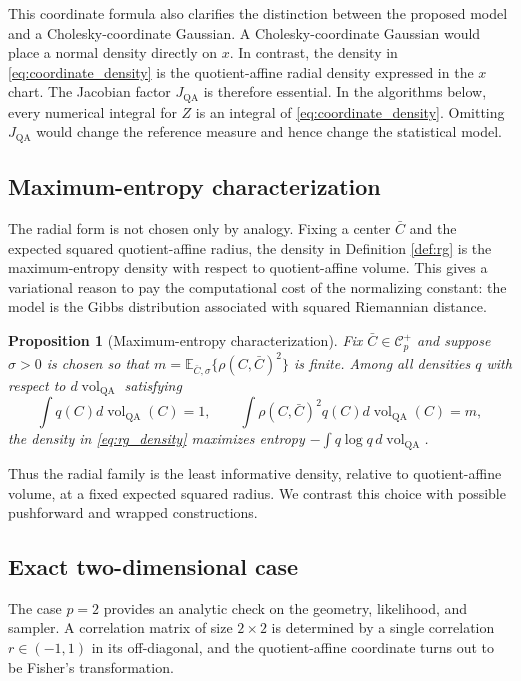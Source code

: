 \documentclass[
  12pt]{article}
\newcommand{\Corr}{\mathcal C^+}
\newcommand{\vol}{\operatorname{vol}}
\newcommand{\E}{\mathbb E}
\newcommand{\QA}{\mathrm{QA}}
\newtheorem{proposition}{Proposition}
\begin{document}
This coordinate formula also clarifies the distinction between the proposed model and a Cholesky-coordinate Gaussian. A Cholesky-coordinate Gaussian would place a normal density directly on $x$. In contrast, the density in \eqref{eq:coordinate_density} is the quotient-affine radial density expressed in the $x$ chart. The Jacobian factor $J_{\QA}$ is therefore essential. In the algorithms below, every numerical integral for $Z$ is an integral of \eqref{eq:coordinate_density}. Omitting $J_{\QA}$ would change the reference measure and hence change the statistical model.



\subsection{Maximum-entropy characterization}

The radial form is not chosen only by analogy. Fixing a center $\bar C$ and  the expected squared quotient-affine radius, the density in Definition \ref{def:rg} is the maximum-entropy density with respect to quotient-affine volume. This gives a variational reason to pay the computational cost of the normalizing constant: the model is the Gibbs distribution associated with squared Riemannian distance.

\begin{proposition}[Maximum-entropy characterization]\label{prop:max_entropy}
Fix $\bar C\in\Corr_p$ and suppose $\sigma>0$ is chosen so that $m=\E_{\bar C,\sigma}\{\rho(C,\bar C)^2\}$ is finite. Among all densities $q$ with respect to $d\vol_{\QA}$ satisfying
\[
\int q(C)d\vol_{\QA}(C)=1,
\qquad
\int \rho(C,\bar C)^2q(C)d\vol_{\QA}(C)=m,
\]
the density in \eqref{eq:rg_density} maximizes entropy $-\int q\log q\,d\vol_{\QA}$.
\end{proposition}

Thus the radial family is the least informative density, relative to quotient-affine volume, at a fixed expected squared radius. We contrast this choice with possible pushforward and wrapped constructions.


\subsection{Exact two-dimensional case}

The case $p=2$ provides an analytic check on the geometry, likelihood, and sampler. A correlation matrix of size $2\times2$  is determined by a single correlation $r\in(-1,1)$ in its off-diagonal, and the quotient-affine coordinate turns out to be Fisher's transformation.
\end{document}
